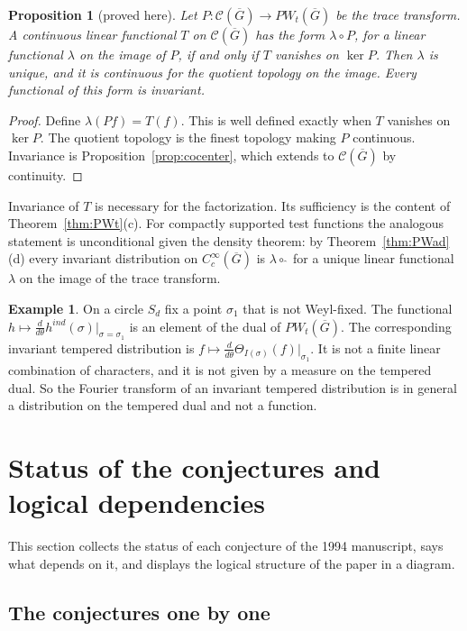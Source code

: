 \documentclass[12pt,letterpaper]{article}
\numberwithin{equation}{section}
\newtheorem{xproposition}[theorem]{Proposition}
\theoremstyle{definition}
\newtheorem{xexample}[theorem]{Example}
\newcommand{\proved}{proved here}
\newcommand{\bG}{\overline{G}}
\newcommand{\calC}{\mathcal C}
\begin{document}
\begin{xproposition}[\proved]\label{prop:factor}
Let $P:\calC(\bG)\to PW_t(\bG)$ be the trace transform.  A continuous linear functional $T$
on $\calC(\bG)$ has the form $\lambda\circ P$, for a linear functional $\lambda$ on the
image of $P$, if and only if $T$ vanishes on $\ker P$.  Then $\lambda$ is unique, and it is
continuous for the quotient topology on the image.  Every functional of this form is
invariant.
\end{xproposition}
\begin{proof}
Define $\lambda(Pf)=T(f)$.  This is well defined exactly when $T$ vanishes on $\ker P$.
The quotient topology is the finest topology making $P$ continuous.  Invariance is
Proposition~\ref{prop:cocenter}, which extends to $\calC(\bG)$ by continuity.
\end{proof}
Invariance of $T$ is necessary for the factorization.  Its sufficiency is the content of
Theorem~\ref{thm:PWt}(c).  For compactly supported test functions the analogous statement
is unconditional given the density theorem: by Theorem~\ref{thm:PWad}(d) every invariant
distribution on $C_c^\infty(\bG)$ is $\lambda\circ\hat{\ }$ for a unique linear functional
$\lambda$ on the image of the trace transform.

\begin{xexample}\label{ex:derivative}
On a circle $S_d$ fix a point $\sigma_1$ that is not Weyl-fixed.  The functional
$h\mapsto\frac{d}{d\theta}h^{ind}(\sigma)|_{\sigma=\sigma_1}$ is an element of the dual of
$PW_t(\bG)$.  The corresponding invariant tempered distribution is
$f\mapsto\frac{d}{d\theta}\Theta_{I(\sigma)}(f)|_{\sigma_1}$.  It is not a finite linear
combination of characters, and it is not given by a measure on the tempered dual.  So the
Fourier transform of an invariant tempered distribution is in general a distribution on
the tempered dual and not a function.
\end{xexample}
\section{Status of the conjectures and logical dependencies}\label{sec:status}

This section collects the status of each conjecture of the 1994 manuscript, says what
depends on it, and displays the logical structure of the paper in a diagram.

\subsection{The conjectures one by one}
\end{document}
